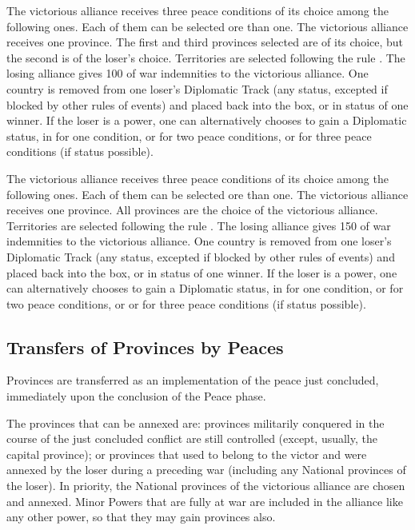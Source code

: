 \bparag The victorious alliance receives three peace conditions of its choice
among the following ones. Each of them can be selected ore than one.
 The victorious alliance receives one province.
The first and third provinces selected are of its choice, but the second is of
the loser's choice.  Territories are selected following the rule
.
\bparag[Indemnities]
The losing alliance gives 100 \ducats of war indemnities to the victorious
alliance.
One country is removed from one loser's Diplomatic Track (any status, excepted
if blocked by other rules of events) and placed back into the \Neutral box, or
in \MR status of one winner.  If the loser is a \MIN power, one can
alternatively chooses to gain a Diplomatic status, in \MR for one condition,
or \AM for two peace conditions, or \VASSAL for three peace conditions (if
status possible).

\bparag The victorious alliance receives three peace conditions of its choice
among the following ones. Each of them can be selected ore than one.
 The victorious alliance receives one province.
All provinces are the choice of the victorious alliance.  Territories are
selected following the rule .
\bparag[Indemnities]
The losing alliance gives 150 \ducats of war indemnities to the victorious
alliance.
One country is removed from one loser's Diplomatic Track (any status, excepted
if blocked by other rules of events) and placed back into the \Neutral box, or
in \MR status of one winner.  If the loser is a \MIN power, one can
alternatively chooses to gain a Diplomatic status, in \MR for one condition,
or \AM for two peace conditions, or \VASSAL or \ANNEXION for three peace
conditions (if status possible).



\subsection{Transfers of Provinces by Peaces}\label{chSpecific:Tranfer
  Provinces Peace}

\aparag Provinces are transferred as an implementation of the peace just
concluded, immediately upon the conclusion of the Peace phase.

The provinces that can be annexed are:
\bparag provinces militarily conquered in the course of the just concluded
conflict are still controlled (except, usually, the capital province);
\bparag or provinces that used to belong to the victor and were annexed by the
loser during a preceding war (including any National provinces of the loser).
\bparag In priority, the National provinces of the victorious alliance are
chosen and annexed.
\bparag Minor Powers that are fully at war are included in the alliance like
any other power, so that they may gain provinces also.

